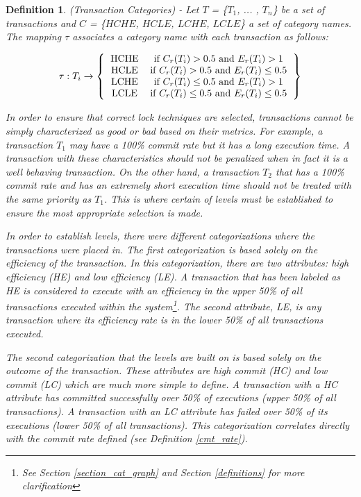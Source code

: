 \documentclass[conference]{IEEEtran}
\newtheorem{definition}{Definition}
\begin{document}
\begin{definition}
\label{transaction_categories}
(Transaction Categories) - Let $T$ = \{$T_{1}$, ... , $T_{n}$\} be a set of transactions and $C$ = \{$HCHE$, $HCLE$, $LCHE$, $LCLE$\} a set of category names. The mapping $\tau$ associates a category name with each transaction as follows:

\[ 
\tau : \textrm{$T_{i}$}\rightarrow
\left \{
  \begin{tabular}{cc}
  HCHE & if $C_{r}(T_{i}) > 0.5$ and $E_{r}(T_{i}) > 1$ \\
  HCLE & if $C_{r}(T_{i}) > 0.5$ and $E_{r}(T_{i}) \le 0.5$ \\
  LCHE & if $C_{r}(T_{i}) \le 0.5$ and $E_{r}(T_{i}) > 1$ \\
  LCLE & if $C_{r}(T_{i}) \le 0.5$ and $E_{r}(T_{i}) \le 0.5$
  \end{tabular}
\right \}
\]

In order to ensure that correct lock techniques are selected, transactions cannot be simply characterized as good or bad based on their metrics. For example, a transaction $T_{1}$ may have a 100\% commit rate but it has a long execution time. A transaction with these characteristics should not be penalized when in fact it is a well behaving transaction. On the other hand, a transaction $T_{2}$ that has a 100\% commit rate and has an extremely short execution time should not be treated with the same priority as $T_{1}$. This is where certain of levels must be established to ensure the most appropriate selection is made.

In order to establish levels, there were different categorizations where the transactions were placed in. The first categorization is based solely on the efficiency of the transaction. In this categorization, there are two attributes: \textit{high efficiency (HE)} and \textit{low efficiency (LE)}. A transaction that has been labeled as \textit{HE} is considered to execute with an efficiency in the upper 50\% of all transactions executed within the system\footnote{See Section \ref{section_cat_graph} and Section \ref{definitions} for more clarification}. The second attribute, \textit{LE}, is any transaction where its efficiency rate is in the lower 50\% of all transactions executed.

The second categorization that the levels are built on is based solely on the outcome of the transaction. These attributes are \textit{high commit (HC)} and \textit{low commit (LC)} which are much more simple to define. A transaction with a \textit{HC} attribute has committed successfully over 50\% of executions (upper 50\% of all transactions). A transaction with an \textit{LC} attribute has failed over 50\% of its executions (lower 50\% of all transactions). This categorization correlates directly with the commit rate defined (see Definition \ref{cmt_rate}).


\end{definition}
\end{document}
